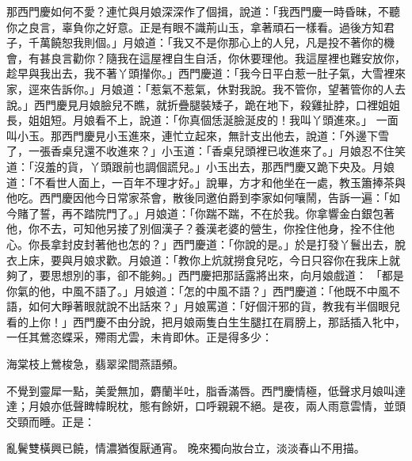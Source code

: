 那西門慶如何不愛？連忙與月娘深深作了個揖，說道：「我西門慶一時昏昧，不聽你之良言，辜負你之好意。正是有眼不識荊山玉，拿著頑石一樣看。過後方知君子，千萬饒恕我則個。」月娘道：「我又不是你那心上的人兒，凡是投不著你的機會，有甚良言勸你？隨我在這屋裡自生自活，你休要理他。我這屋裡也難安放你，趁早與我出去，我不著丫頭攆你。」西門慶道：「我今日平白惹一肚子氣，大雪裡來家，逕來告訴你。」月娘道：「惹氣不惹氣，休對我說。我不管你，望著管你的人去說。」西門慶見月娘臉兒不瞧，就折疊腿裝矮子，跪在地下，殺雞扯脖，口裡姐姐長，姐姐短。月娘看不上，說道：「你真個恁涎臉涎皮的！我叫丫頭進來。」 一面叫小玉。那西門慶見小玉進來，連忙立起來，無計支出他去，說道：「外邊下雪了，一張香桌兒還不收進來？」小玉道：「香桌兒頭裡已收進來了。」月娘忍不住笑道：「沒羞的貨，丫頭跟前也調個謊兒。」小玉出去，那西門慶又跪下央及。月娘道：「不看世人面上，一百年不理才好。」說畢，方才和他坐在一處，教玉簫捧茶與他吃。西門慶因他今日常家茶會，散後同邀伯爵到李家如何嚷鬧，告訴一遍：「如今賭了誓，再不踏院門了。」月娘道：「你踹不踹，不在於我。你拿響金白銀包著他，你不去，可知他另接了別個漢子？養漢老婆的營生，你拴住他身，拴不住他心。你長拿封皮封著他也怎的？」西門慶道：「你說的是。」於是打發丫鬟出去，脫衣上床，要與月娘求歡。月娘道：「教你上炕就撈食兒吃，今日只容你在我床上就夠了，要思想別的事，卻不能夠。」西門慶把那話露將出來，向月娘戲道： 「都是你氣的他，中風不語了。」月娘道：「怎的中風不語？」西門慶道：「他既不中風不語，如何大睜著眼就說不出話來？」月娘罵道：「好個汗邪的貨，教我有半個眼兒看的上你！」西門慶不由分說，把月娘兩隻白生生腿扛在肩膀上，那話插入牝中，一任其鶯恣蝶采，殢雨尤雲，未肯即休。正是得多少：

海棠枝上鶯梭急，翡翠梁間燕語頻。

不覺到靈犀一點，美愛無加，麝蘭半吐，脂香滿唇。西門慶情極，低聲求月娘叫達達；月娘亦低聲睥幃睨枕，態有餘妍，口呼親親不絕。是夜，兩人雨意雲情，並頭交頸而睡。正是：

亂鬢雙橫興已饒，情濃猶復厭通宵。
晚來獨向妝台立，淡淡春山不用描。


